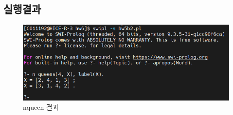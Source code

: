 \documentclass{article}
\begin{document}
\subsection{실행결과}
\begin{figure}[h]
    \centering
    \includegraphics[scale = 0.7]{nqueens실행결과.png}
    \caption{nqueen 결과}
\end{figure}
\end{document}
